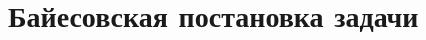\documentclass[12pt]{article}
\begin{document}

	\section{Байесовская постановка задачи} 
	
	\newpage 
\end{document}
